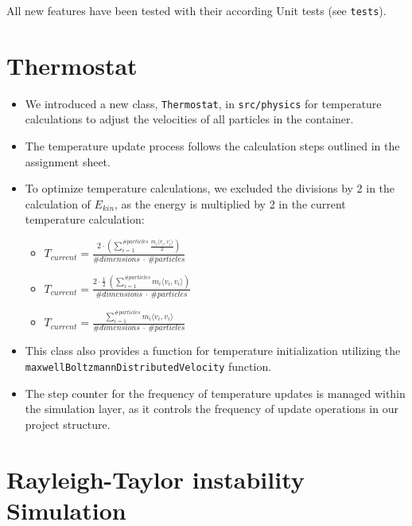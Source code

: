 \documentclass{article}
\begin{document}
All new features have been tested with their according Unit tests (see \texttt{tests}).

\section{Thermostat}
\label{sec:thermo}

    \begin{itemize}
        \item We introduced a new class, \texttt{Thermostat}, in \texttt{src/physics} for temperature calculations to adjust the velocities of all particles in the container.
        \item The temperature update process follows the calculation steps outlined in the assignment sheet.
        \item To optimize temperature calculations, we excluded the divisions by 2 in the calculation of $E_{kin}$, as the energy is multiplied by 2 in the current temperature calculation:
        \begin{itemize}
            \item $T_{current} = \frac{2 \cdot \left(\sum_{i=1}^{\#particles} \frac{m_i \langle v_i, v_i \rangle}{2}\right)}{\#dimensions\ \cdot\ \#particles}$
            \item $T_{current} = \frac{2 \cdot \frac{1}{2}\ \left(\sum_{i=1}^{\#particles} m_i \langle v_i, v_i \rangle\right)}{\#dimensions\ \cdot\ \#particles}$
            \item $T_{current} = \frac{\sum_{i=1}^{\#particles} m_i \langle v_i, v_i \rangle}{\#dimensions\ \cdot\ \#particles}$
        \end{itemize}
        \item This class also provides a function for temperature initialization utilizing the \texttt{maxwellBoltzmannDistributedVelocity} function.
        \item The step counter for the frequency of temperature updates is managed within the simulation layer, as it controls the frequency of update operations in our project structure.
    \end{itemize}
    
    
\section{Rayleigh-Taylor instability Simulation}
\label{sec:rayleigh}
\end{document}
